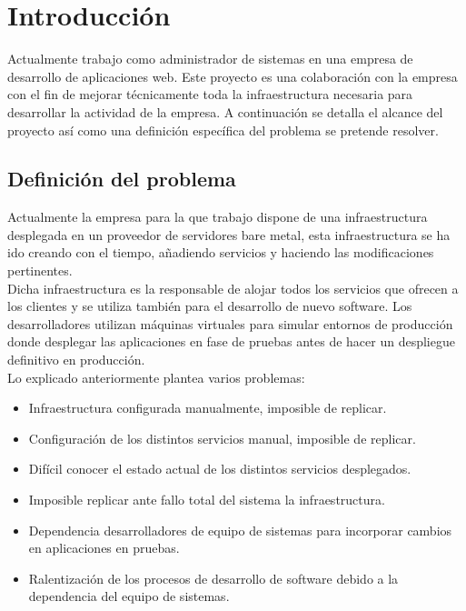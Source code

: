 \chapter {Introducción}
	\begin{paragraph}
		Actualmente trabajo como administrador de sistemas en una empresa de desarrollo de aplicaciones web. Este proyecto es una colaboración con la empresa con el fin de mejorar técnicamente toda la infraestructura necesaria para desarrollar la actividad de la empresa. A continuación se detalla el alcance del proyecto así como una definición específica del problema se pretende resolver.
	\end{paragraph}
\section{Definición del problema}
	\begin{text}
		Actualmente la empresa para la que trabajo dispone de una infraestructura desplegada en un proveedor de servidores bare metal, esta infraestructura se ha ido creando con el tiempo, añadiendo servicios y haciendo las modificaciones pertinentes. \\
		Dicha infraestructura es la responsable de alojar todos los servicios que ofrecen a los clientes y se utiliza también para el desarrollo de nuevo software. Los desarrolladores utilizan máquinas virtuales para simular entornos de producción donde desplegar las aplicaciones en fase de pruebas antes de hacer un despliegue definitivo en producción. \\
		Lo explicado anteriormente plantea varios problemas:
		\begin{itemize}
			\item Infraestructura configurada manualmente, imposible de replicar.
			\item Configuración de los distintos servicios manual, imposible de replicar. 
			\item Difícil conocer el estado actual de los distintos servicios desplegados. 
			\item Imposible replicar ante fallo total del sistema la infraestructura.
			\item Dependencia desarrolladores de equipo de sistemas para incorporar cambios en aplicaciones en pruebas.
			\item Ralentización de los procesos de desarrollo de software debido a la dependencia del equipo de sistemas.
		\end{itemize}
	\end{text}

